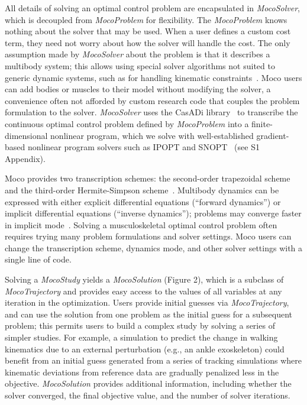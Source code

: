 \documentclass[10pt,letterpaper]{article}
\begin{document}
All details of solving an optimal control problem are encapsulated in \textit{MocoSolver}, which is decoupled from \textit{MocoProblem} for flexibility. The \textit{MocoProblem} knows nothing about the solver that may be used. When a user defines a custom cost term, they need not worry about how the solver will handle the cost. The only assumption made by \textit{MocoSolver} about the problem is that it describes a multibody system; this allows using special solver algorithms not suited to generic dynamic systems, such as for handling kinematic constraints~\cite{Posa:2016}. Moco users can add bodies or muscles to their model without modifying the solver, a convenience often not afforded by custom research code that couples the problem formulation to the solver. \textit{MocoSolver} uses the CasADi library~\cite{Andersson:2019} to transcribe the continuous optimal control problem defined by \textit{MocoProblem} into a finite-dimensional nonlinear program, which we solve with well-established gradient-based nonlinear program solvers such as IPOPT and SNOPT~\cite{Wachter:2006,Gill:2005} (see S1 Appendix).

Moco provides two transcription schemes: the second-order trapezoidal scheme and the third-order Hermite-Simpson scheme~\cite{Betts:2010}. Multibody dynamics can be expressed with either explicit differential equations (“forward dynamics”) or implicit differential equations (“inverse dynamics”); problems may converge faster in implicit mode~\cite{vandenBogert:2011fv,Groote:2016dq}. Solving a musculoskeletal optimal control problem often requires trying many problem formulations and solver settings. Moco users can change the transcription scheme, dynamics mode, and other solver settings with a single line of code.

Solving a \textit{MocoStudy} yields a \textit{MocoSolution} (Figure 2), which is a subclass of \textit{MocoTrajectory} and provides easy access to the values of all variables at any iteration in the optimization. Users provide initial guesses via \textit{MocoTrajectory}, and can use the solution from one problem as the initial guess for a subsequent problem; this permits users to build a complex study by solving a series of simpler studies. For example, a simulation to predict the change in walking kinematics due to an external perturbation (e.g., an ankle exoskeleton) could benefit from an initial guess generated from a series of tracking simulations where kinematic deviations from reference data are gradually penalized less in the objective. \textit{MocoSolution} provides additional information, including whether the solver converged, the final objective value, and the number of solver iterations.
\end{document}
